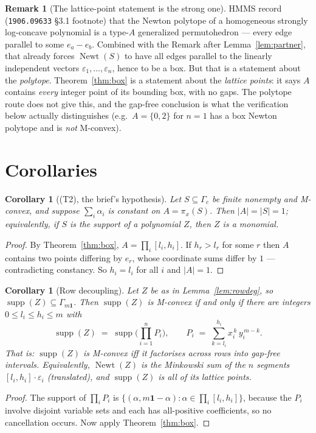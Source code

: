 \documentclass[11pt]{article}
\newtheorem{corollary}[theorem]{Corollary}
\theoremstyle{definition}
\newtheorem{remark}[theorem]{Remark}
\newcommand{\supp}{\operatorname{supp}}
\newcommand{\Newt}{\operatorname{Newt}}
\begin{document}
\begin{remark}[The lattice-point statement is the strong one]
HMMS record (\texttt{1906.09633} \S3.1 footnote) that the Newton polytope of a homogeneous
strongly log-concave polynomial is a type-$A$ generalized permutohedron --- every edge
parallel to some $e_a-e_b$. Combined with the Remark after Lemma~\ref{lem:partner}, that
already forces $\Newt(S)$ to have all edges parallel to the linearly independent vectors
$\varepsilon_1,\dots,\varepsilon_n$, hence to be a box. But that is a statement about the
\emph{polytope}. Theorem~\ref{thm:box} is a statement about the \emph{lattice points}: it
says $A$ contains \emph{every} integer point of its bounding box, with no gaps. The
polytope route does not give this, and the gap-free conclusion is what the verification
below actually distinguishes (e.g.\ $A=\{0,2\}$ for $n=1$ has a box Newton polytope and is
\emph{not} M-convex).
\end{remark}

\section{Corollaries}

\begin{corollary}[(T2), the brief's hypothesis]\label{cor:T2}
Let $S\subseteq\Gamma_c$ be finite nonempty and M-convex, and suppose
$\sum_i\alpha_i$ is constant on $A=\pi_x(S)$. Then $|A|=|S|=1$; equivalently, if $S$ is the
support of a polynomial $Z$, then $Z$ is a monomial.
\end{corollary}
\begin{proof}
By Theorem~\ref{thm:box}, $A=\prod_i[l_i,h_i]$. If $h_r>l_r$ for some $r$ then $A$ contains
two points differing by $e_r$, whose coordinate sums differ by $1$ --- contradicting
constancy. So $h_i=l_i$ for all $i$ and $|A|=1$.
\end{proof}

\begin{corollary}[Row decoupling]\label{cor:decouple}
Let $Z$ be as in Lemma~\ref{lem:rowdeg}, so $\supp(Z)\subseteq\Gamma_{m\mathbf1}$. Then
$\supp(Z)$ is M-convex if and only if there are integers $0\le l_i\le h_i\le m$ with
\[
\supp(Z)\;=\;\supp\Big(\prod_{i=1}^{n}P_i\Big),
\qquad
P_i \;=\; \sum_{k=l_i}^{h_i} x_i^{\,k}\,y_i^{\,m-k}.
\]
That is: \emph{$\supp(Z)$ is M-convex iff it factorises across rows into gap-free intervals.}
Equivalently, $\Newt(Z)$ is the Minkowski sum of the $n$ segments
$[l_i,h_i]\cdot\varepsilon_i$ (translated), \emph{and} $\supp(Z)$ is all of its lattice
points.
\end{corollary}
\begin{proof}
The support of $\prod_iP_i$ is $\{(\alpha,m\mathbf1-\alpha):\alpha\in\prod_i[l_i,h_i]\}$,
because the $P_i$ involve disjoint variable sets and each has all-positive coefficients, so
no cancellation occurs. Now apply Theorem~\ref{thm:box}.
\end{proof}
\end{document}
